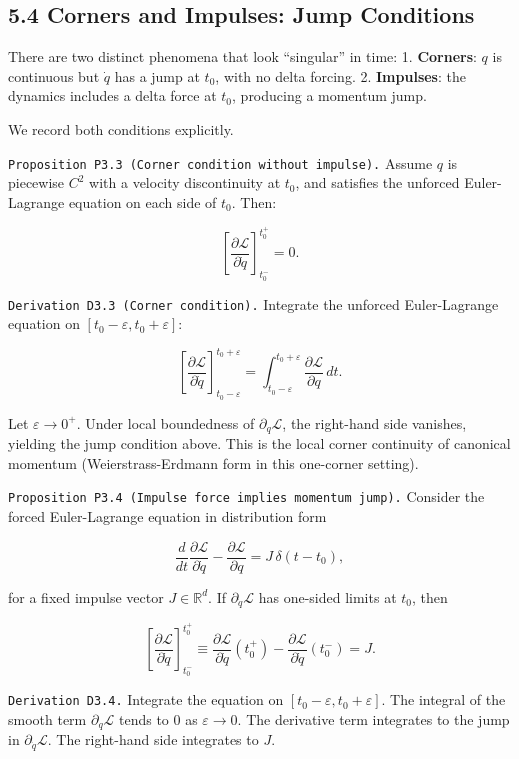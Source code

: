 \documentclass[
]{article}
\begin{document}
\subsection{5.4 Corners and Impulses: Jump
Conditions}\label{corners-and-impulses-jump-conditions}

There are two distinct phenomena that look ``singular'' in time: 1.
\textbf{Corners}: \(q\) is continuous but \(\dot q\) has a jump at
\(t_0\), with no delta forcing. 2. \textbf{Impulses}: the dynamics
includes a delta force at \(t_0\), producing a momentum jump.

We record both conditions explicitly.

\texttt{Proposition\ P3.3\ (Corner\ condition\ without\ impulse).}
Assume \(q\) is piecewise \(C^2\) with a velocity discontinuity at
\(t_0\), and satisfies the unforced Euler-Lagrange equation on each side
of \(t_0\). Then:

\[
\left[\frac{\partial\mathcal L}{\partial\dot q}\right]_{t_0^-}^{t_0^+}=0.
\]

\texttt{Derivation\ D3.3\ (Corner\ condition).} Integrate the unforced
Euler-Lagrange equation on \([t_0-\varepsilon,t_0+\varepsilon]\):

\[
\left[\frac{\partial\mathcal L}{\partial\dot q}\right]_{t_0-\varepsilon}^{t_0+\varepsilon}
=\int_{t_0-\varepsilon}^{t_0+\varepsilon}\frac{\partial\mathcal L}{\partial q}\,dt.
\]

Let \(\varepsilon\to0^+\). Under local boundedness of
\(\partial_q\mathcal L\), the right-hand side vanishes, yielding the
jump condition above. This is the local corner continuity of canonical
momentum (Weierstrass-Erdmann form in this one-corner setting).

\texttt{Proposition\ P3.4\ (Impulse\ force\ implies\ momentum\ jump).}
Consider the forced Euler-Lagrange equation in distribution form

\[
\frac{d}{dt}\frac{\partial\mathcal L}{\partial\dot q}
-\frac{\partial\mathcal L}{\partial q}
=J\,\delta(t-t_0),
\]

for a fixed impulse vector \(J\in\mathbb R^d\). If
\(\partial_{\dot q}\mathcal L\) has one-sided limits at \(t_0\), then

\[
\left[\frac{\partial\mathcal L}{\partial\dot q}\right]_{t_0^-}^{t_0^+}
\equiv
\frac{\partial\mathcal L}{\partial\dot q}(t_0^+)-\frac{\partial\mathcal L}{\partial\dot q}(t_0^-)
=J.
\]

\texttt{Derivation\ D3.4.} Integrate the equation on
\([t_0-\varepsilon,t_0+\varepsilon]\). The integral of the smooth term
\(\partial_q\mathcal L\) tends to 0 as \(\varepsilon\to 0\). The
derivative term integrates to the jump in
\(\partial_{\dot q}\mathcal L\). The right-hand side integrates to
\(J\).
\end{document}
